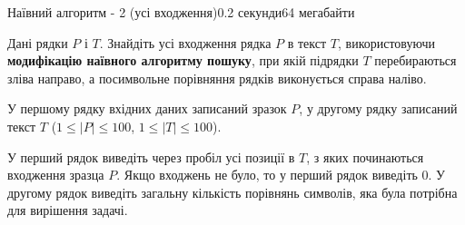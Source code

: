 \begin{problem}{Наївний алгоритм - 2 (усі входження)}{}{}{0.2 секунди}{64 мегабайти}

Дані рядки $P$ і $T$. Знайдіть усі входження рядка $P$ в текст $T$, використовуючи {\bf модифікацію наївного алгоритму пошуку}, 
при якій підрядки $T$ перебираються зліва направо, а посимвольне порівняння рядків виконується справа наліво.

\InputFile
У першому рядку вхідних даних записаний зразок $P$, 
у другому рядку записаний текст $T$ ($1 \le |P| \le 100$, $1 \le |T| \le 100$).


\OutputFile
У перший рядок виведіть через пробіл усі позиції в $T$, з яких починаються входження зразца $P$. 
Якщо входжень не було, то у перший рядок виведіть 0.
У другому рядок виведіть загальну кількість порівнянь символів, яка була потрібна для вирішення задачі. 

\Examples

\begin{example}
%
\end{example}

\end{problem}

